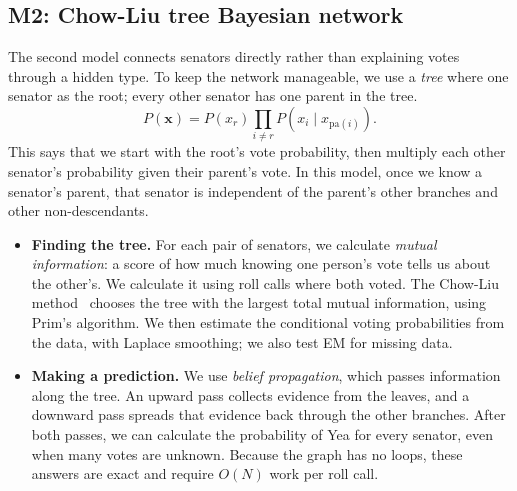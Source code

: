 \documentclass[10pt]{article}
\begin{document}
\subsection{M2: Chow-Liu tree Bayesian network}
The second model connects senators directly rather than explaining votes through a hidden type. To keep the network manageable, we use a \emph{tree} where one senator as the root; every other senator has one parent in the tree.
\begin{equation}
P(\mathbf x)=P(x_r)\prod_{i\ne r}P(x_i\mid x_{\mathrm{pa}(i)}).
\end{equation}
This says that we start with the root's vote probability, then multiply each other senator's probability given their parent's vote. In this model, once we know a senator's parent, that senator is independent of the parent's other branches and other non-descendants. 
\begin{itemize}
\item \textbf{Finding the tree.} For each pair of senators, we calculate \emph{mutual information}: a score of how much knowing one person's vote tells us about the other's. We calculate it using roll calls where both voted. The Chow-Liu method~\cite{chowliu1968} chooses the tree with the largest total mutual information, using Prim's algorithm. We then estimate the conditional voting probabilities from the data, with Laplace smoothing; we also test EM for missing data.
\item \textbf{Making a prediction.} We use \emph{belief propagation}, which passes information along the tree. An upward pass collects evidence from the leaves, and a downward pass spreads that evidence back through the other branches. After both passes, we can calculate the probability of Yea for every senator, even when many votes are unknown. Because the graph has no loops, these answers are exact and require $O(N)$ work per roll call.
\end{itemize}
\end{document}
